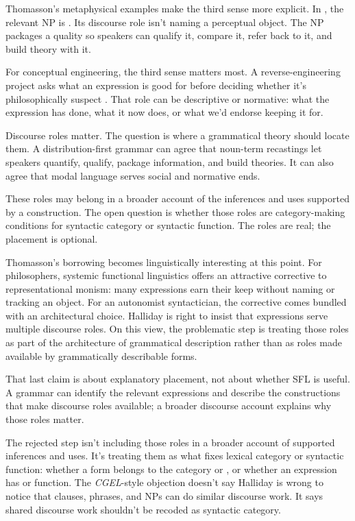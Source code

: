 \documentclass[12pt]{article}
\begin{document}
Thomasson's metaphysical examples make the third sense more explicit. In , the relevant NP is . Its discourse role isn't naming a perceptual object. The NP packages a quality so speakers can qualify it, compare it, refer back to it, and build theory with it.

For conceptual engineering, the third sense matters most. A reverse-engineering project asks what an expression is good for before deciding whether it's philosophically suspect \citep[203--207]{thomasson2025rethink}. That role can be descriptive or normative: what the expression has done, what it now does, or what we'd endorse keeping it for.

Discourse roles matter. The question is where a grammatical theory should locate them. A distribution-first grammar can agree that noun-term recastings let speakers quantify, qualify, package information, and build theories. It can also agree that modal language serves social and normative ends.

These roles may belong in a broader account of the inferences and uses supported by a construction. The open question is whether those roles are category-making conditions for syntactic category or syntactic function. The roles are real; the placement is optional.

Thomasson's borrowing becomes linguistically interesting at this point. For philosophers, systemic functional linguistics offers an attractive corrective to representational monism: many expressions earn their keep without naming or tracking an object. For an autonomist syntactician, the corrective comes bundled with an architectural choice. Halliday is right to insist that expressions serve multiple discourse roles. On this view, the problematic step is treating those roles as part of the architecture of grammatical description rather than as roles made available by grammatically describable forms.

That last claim is about explanatory placement, not about whether SFL is useful. A grammar can identify the relevant expressions and describe the constructions that make discourse roles available; a broader discourse account explains why those roles matter.

The rejected step isn't including those roles in a broader account of supported inferences and uses. It's treating them as what fixes lexical category or syntactic function: whether a form belongs to the category  or , or whether an expression has  or  function. The \emph{CGEL}-style objection doesn't say Halliday is wrong to notice that clauses, phrases, and NPs can do similar discourse work. It says shared discourse work shouldn't be recoded as syntactic category.
\end{document}
